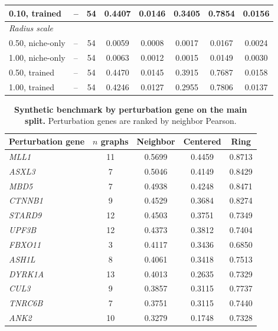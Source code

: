 \documentclass[sigconf,review,balance=false]{acmart}
\begin{document}
\begin{table}[t]
\begin{tabular}{llcccccc}
0.10, trained & -- & 54 & 0.4407 & 0.0146 & 0.3405 & 0.7854 & 0.0156 \\
\midrule
\multicolumn{8}{l}{\textit{Radius scale}} \\
0.50, niche-only & -- & 54 & 0.0059 & 0.0008 & 0.0017 & 0.0167 & 0.0024 \\
1.00, niche-only & -- & 54 & 0.0063 & 0.0012 & 0.0015 & 0.0149 & 0.0030 \\
0.50, trained & -- & 54 & 0.4470 & 0.0145 & 0.3915 & 0.7687 & 0.0158 \\
1.00, trained & -- & 54 & 0.4246 & 0.0127 & 0.2955 & 0.7806 & 0.0137 \\
\bottomrule
\end{tabular}
\end{table}

\begin{table}[t]
\centering
\small
\setlength{\tabcolsep}{5pt}
\renewcommand{\arraystretch}{1.08}
\caption{\textbf{Synthetic benchmark by perturbation gene on the main split.}
Perturbation genes are ranked by neighbor Pearson.}
\label{tab:synthetic_lr_gene_breakdown}
\begin{tabular}{lcccc}
\toprule
Perturbation gene & $n$ graphs & Neighbor & Centered & Ring \\
\midrule
\textit{MLL1} & 11 & 0.5699 & 0.4459 & 0.8713 \\
\textit{ASXL3} & 7 & 0.5046 & 0.4149 & 0.8429 \\
\textit{MBD5} & 7 & 0.4938 & 0.4248 & 0.8471 \\
\textit{CTNNB1} & 9 & 0.4529 & 0.3684 & 0.8274 \\
\textit{STARD9} & 12 & 0.4503 & 0.3751 & 0.7349 \\
\textit{UPF3B} & 12 & 0.4373 & 0.3812 & 0.7404 \\
\textit{FBXO11} & 3 & 0.4117 & 0.3436 & 0.6850 \\
\textit{ASH1L} & 8 & 0.4061 & 0.3418 & 0.7513 \\
\textit{DYRK1A} & 13 & 0.4013 & 0.2635 & 0.7329 \\
\textit{CUL3} & 9 & 0.3857 & 0.3115 & 0.7737 \\
\textit{TNRC6B} & 7 & 0.3751 & 0.3115 & 0.7440 \\
\textit{ANK2} & 10 & 0.3279 & 0.1748 & 0.7328 \\
\bottomrule
\end{tabular}
\end{table}
\end{document}
